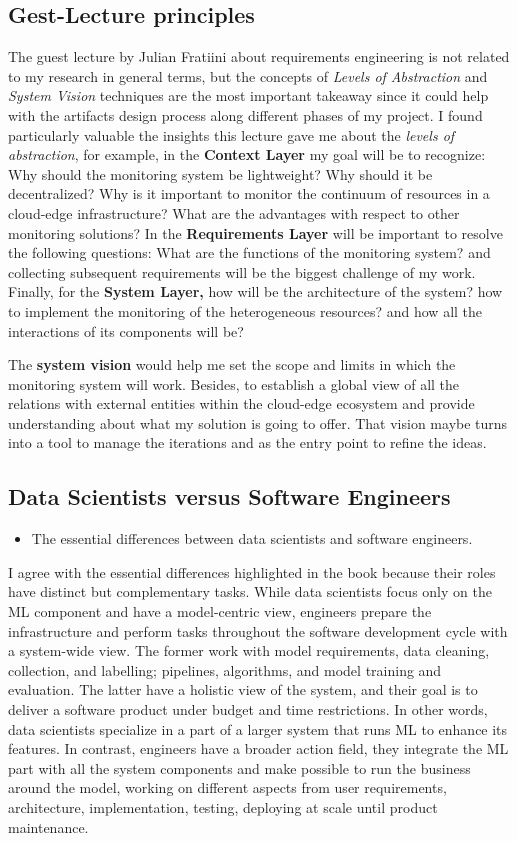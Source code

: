 \documentclass[11pt,a4paper]{article}
\begin{document}
\subsection*{Gest-Lecture principles}
The guest lecture by Julian Fratiini about requirements engineering is not related to my research in general terms, but the concepts of \textit{Levels of Abstraction} and \textit{System Vision} techniques are the most important takeaway since it could help with the artifacts design process along different phases of my project. 
I found particularly valuable the insights this lecture gave me about the \textit{levels of abstraction}, for example, in the \textbf{Context Layer} my goal will be to recognize: Why should the monitoring system be lightweight? Why should it be decentralized? Why is it important to monitor the continuum of resources in a cloud-edge infrastructure? What are the advantages with respect to other monitoring solutions?
In the \textbf{Requirements Layer} will be important to resolve the following questions: What are the functions of the monitoring system? and collecting subsequent requirements will be the biggest challenge of my work. Finally, for the \textbf{System Layer,} how will be the architecture of the system? how to implement the monitoring of the heterogeneous resources? and how all the interactions of its components will be? 

The \textbf{system vision} would help me set the scope and limits in which the monitoring system will work. Besides, to establish a global view of all the relations with external entities within the cloud-edge ecosystem and provide understanding about what my solution is going to offer. That vision maybe turns into a tool to manage the iterations and as the entry point to refine the ideas. 
\\
\subsection*{Data Scientists versus Software Engineers}
\begin{itemize}
   \item The essential differences between data scientists and software engineers.
\end{itemize}

I agree with the essential differences highlighted in the book because their roles have distinct but complementary tasks. While data scientists focus only on the ML component and have a model-centric view, engineers prepare the infrastructure and perform tasks throughout the software development cycle with a system-wide view. The former work with model requirements, data cleaning, collection, and labelling; pipelines, algorithms, and model training and evaluation. The latter have a holistic view of the system, and their goal is to deliver a software product under budget and time restrictions. In other words, data scientists specialize in a part of a larger system that runs ML to enhance its features. In contrast, engineers have a broader action field, they integrate the ML part with all the system components and make possible to run the business around the model, working on different aspects from user requirements, architecture, implementation, testing, deploying at scale until product maintenance. 
\end{document}
